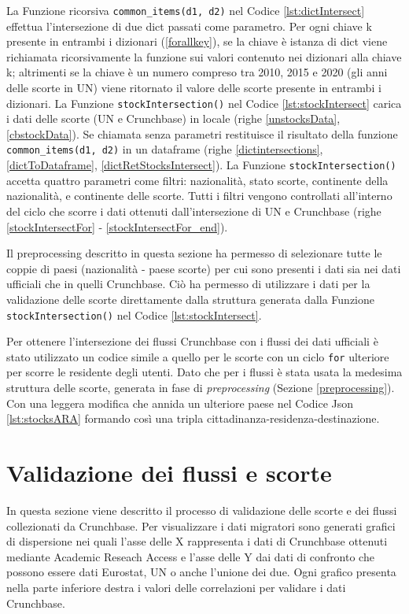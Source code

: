 La Funzione ricorsiva \texttt{common\_items(d1, d2)} nel Codice \ref{lst:dictIntersect} effettua l'intersezione di due dict passati come parametro. Per ogni chiave k presente in entrambi i dizionari (\ref{forallkey}), se la chiave è istanza di dict viene richiamata ricorsivamente la funzione sui valori contenuto nei dizionari alla chiave k; altrimenti se la chiave è un numero compreso tra 2010, 2015 e 2020 (gli anni delle scorte in UN) viene ritornato il valore delle scorte presente in entrambi i dizionari. 
La Funzione \texttt{stockIntersection()} nel Codice \ref{lst:stockIntersect} carica i dati delle scorte (UN e Crunchbase) in locale (righe \ref{unstocksData}, \ref{cbstockData}). Se chiamata senza parametri restituisce il risultato della funzione \texttt{common\_items(d1, d2)} in un dataframe (righe \ref{dictintersections}, \ref{dictToDataframe}, \ref{dictRetStocksIntersect}). La Funzione \texttt{stockIntersection()} accetta quattro parametri come filtri: nazionalità, stato scorte, continente della nazionalità,  e continente delle scorte. Tutti i filtri vengono controllati all'interno del ciclo che scorre i dati ottenuti dall'intersezione di UN e Crunchbase (righe \ref{stockIntersectFor} - \ref{stockIntersectFor_end}). 


Il preprocessing descritto in questa sezione ha permesso di selezionare tutte le coppie di paesi (nazionalità - paese scorte) per cui sono presenti i dati sia nei dati ufficiali che in quelli Crunchbase. Ciò ha permesso di utilizzare i dati per la validazione delle scorte direttamente dalla struttura generata dalla Funzione \texttt{stockIntersection()} nel Codice \ref{lst:stockIntersect}. 

Per ottenere l'intersezione dei flussi Crunchbase con i flussi dei dati ufficiali è stato utilizzato un codice simile a quello per le scorte con un ciclo \texttt{for} ulteriore per scorre le residente degli utenti. Dato che per i flussi è stata usata la medesima struttura delle scorte, generata in fase di \textit{preprocessing} (Sezione \ref{preprocessing}). Con una leggera modifica che annida un ulteriore paese nel Codice Json \ref{lst:stocksARA} formando così una tripla cittadinanza-residenza-destinazione.

\section{Validazione dei flussi e scorte}
\label{analisidatiARA}
In questa sezione viene descritto il processo di validazione delle scorte e dei flussi collezionati da Crunchbase. 
Per visualizzare i dati migratori sono generati grafici di dispersione nei quali l'asse delle X rappresenta i dati di Crunchbase ottenuti mediante Academic Reseach Access e l'asse delle Y dai dati di confronto che possono essere dati Eurostat, UN o anche l'unione dei due. Ogni grafico presenta nella parte inferiore destra i valori delle correlazioni per validare i dati Crunchbase.  


